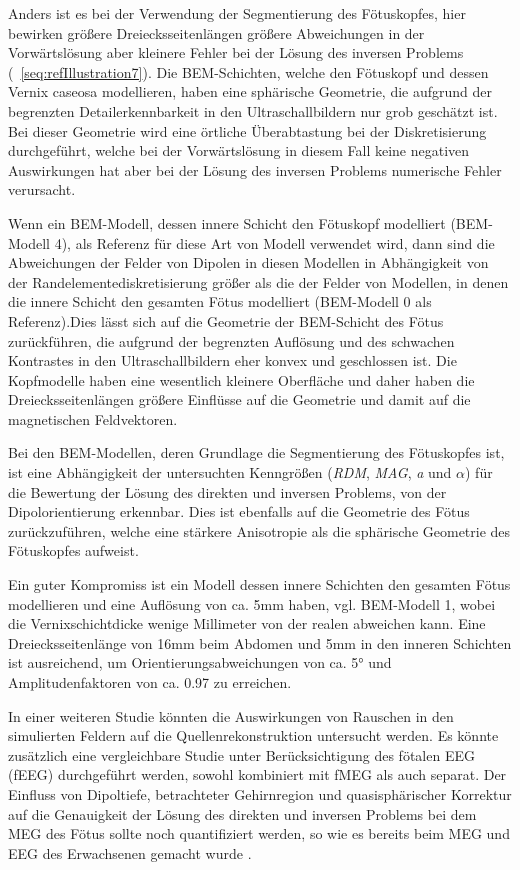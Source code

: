 Anders ist es bei der Verwendung der Segmentierung des Fötuskopfes, hier
bewirken größere Dreiecksseitenlängen größere Abweichungen in der
Vorwärtslösung aber kleinere Fehler bei der Lösung des inversen
Problems (\figurename~\ref{seq:refIllustration7}). Die BEM-Schichten,
welche den Fötuskopf und dessen Vernix caseosa modellieren, haben eine
sphärische Geometrie, die aufgrund der begrenzten Detailerkennbarkeit
in den Ultraschallbildern nur grob geschätzt ist. Bei dieser Geometrie
wird eine örtliche Überabtastung bei der Diskretisierung durchgeführt,
welche bei der Vorwärtslösung in diesem Fall keine negativen
Auswirkungen hat aber bei der Lösung des inversen Problems numerische
Fehler verursacht.

Wenn ein BEM-Modell, dessen innere Schicht den Fötuskopf modelliert
(BEM-Modell 4), als Referenz für diese Art von Modell verwendet wird,
dann sind die Abweichungen der Felder von Dipolen in diesen Modellen in
Abhängigkeit von der Randelementediskretisierung größer als die der
Felder von Modellen, in denen die innere Schicht den gesamten Fötus
modelliert (BEM-Modell 0 als Referenz).Dies lässt sich auf die
Geometrie der BEM-Schicht des Fötus zurückführen, die aufgrund der
begrenzten Auflösung und des schwachen Kontrastes in den
Ultraschallbildern eher konvex und geschlossen ist. Die Kopfmodelle
haben eine wesentlich kleinere Oberfläche und daher haben die
Dreiecksseitenlängen größere Einflüsse auf die Geometrie und damit auf
die magnetischen Feldvektoren.

Bei den BEM-Modellen, deren Grundlage die Segmentierung des Fötuskopfes
ist, ist eine Abhängigkeit der untersuchten Kenngrößen
(\textit{RDM},\textit{ MAG},\textit{ a} und $\alpha $) für die
Bewertung der Lösung des direkten und inversen Problems, von der
Dipolorientierung erkennbar. Dies ist ebenfalls auf die Geometrie des
Fötus zurückzuführen, welche eine stärkere Anisotropie als die
sphärische Geometrie des Fötuskopfes aufweist.

Ein guter Kompromiss ist ein Modell dessen innere Schichten den gesamten
Fötus modellieren und eine Auflösung von ca. 5mm haben, vgl. BEM-Modell
1, wobei die Vernixschichtdicke wenige Millimeter von der realen
abweichen kann. Eine Dreiecksseitenlänge von 16mm beim Abdomen und 5mm
in den inneren Schichten ist ausreichend, um Orientierungsabweichungen
von ca. 5° und Amplitudenfaktoren von ca. 0.97 zu erreichen.

In einer weiteren Studie könnten die Auswirkungen von Rauschen in den
simulierten Feldern auf die Quellenrekonstruktion untersucht werden. Es
könnte zusätzlich eine vergleichbare Studie unter Berücksichtigung des
fötalen EEG (fEEG) durchgeführt werden, sowohl kombiniert mit fMEG als
auch separat. Der Einfluss von Dipoltiefe, betrachteter Gehirnregion
und quasisphärischer Korrektur auf die Genauigkeit der Lösung des
direkten und inversen Problems bei dem MEG des Fötus sollte noch
quantifiziert werden, so wie es bereits beim MEG und EEG des
Erwachsenen gemacht wurde \cite{a2}.
